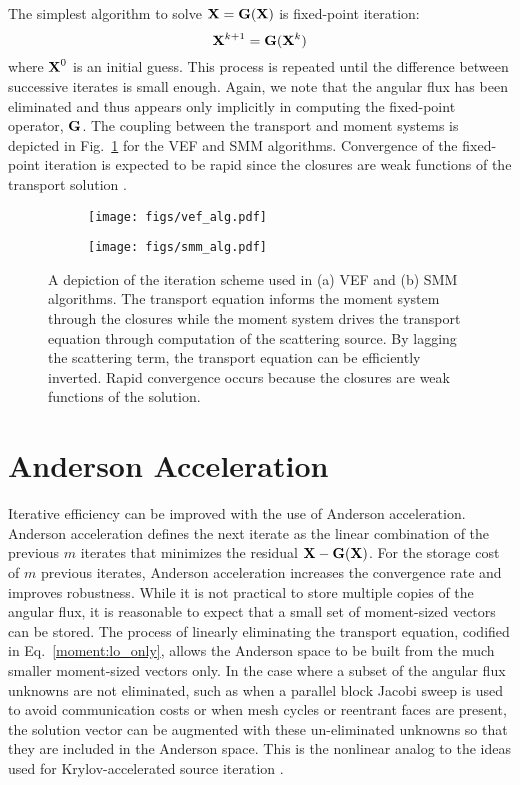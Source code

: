 \documentclass[../doc.tex]{subfiles}
\begin{document}
The simplest algorithm to solve $\boldsymbol{\mathrm{X}} = \boldsymbol{\mathrm{G}}(\boldsymbol{\mathrm{X}})$ is fixed-point iteration: 
	\begin{equation}
		\boldsymbol{\mathrm{X}}^{k+1} = \boldsymbol{\mathrm{G}}(\boldsymbol{\mathrm{X}}^k) 
	\end{equation}
where $\boldsymbol{\mathrm{X}}^0$ is an initial guess. This process is repeated until the difference between successive iterates is small enough. Again, we note that the angular flux has been eliminated and thus appears only implicitly in computing the fixed-point operator, $\boldsymbol{\mathrm{G}}$. The coupling between the transport and moment systems is depicted in Fig.~\ref{moment:moment_alg} for the VEF and SMM algorithms. Convergence of the fixed-point iteration is expected to be rapid since the closures are weak functions of the transport solution \cite{goldin}. 
\begin{figure}
\centering
\begin{subfigure}{.47\textwidth}
	\centering
	\texttt{[image: figs/vef\_alg.pdf]}	
	\caption{}
\end{subfigure}
\hfill
\begin{subfigure}{.47\textwidth}
	\centering
	\texttt{[image: figs/smm\_alg.pdf]}	
	\caption{}
\end{subfigure}
\caption{A depiction of the iteration scheme used in (a) VEF and (b) SMM algorithms. The transport equation informs the moment system through the closures while the moment system drives the transport equation through computation of the scattering source. By lagging the scattering term, the transport equation can be efficiently inverted. Rapid convergence occurs because the closures are weak functions of the solution.}
\label{moment:moment_alg}
\end{figure}

\section{Anderson Acceleration}
Iterative efficiency can be improved with the use of Anderson acceleration. Anderson acceleration defines the next iterate as the linear combination of the previous $m$ iterates that minimizes the residual $\boldsymbol{\mathrm{X}} - \boldsymbol{\mathrm{G}}(\boldsymbol{\mathrm{X}})$. For the storage cost of $m$ previous iterates, Anderson acceleration increases the convergence rate and improves robustness. While it is not practical to store multiple copies of the angular flux, it is reasonable to expect that a small set of moment-sized vectors can be stored. The process of linearly eliminating the transport equation, codified in Eq.~\ref{moment:lo_only}, allows the Anderson space to be built from the much smaller moment-sized vectors only. In the case where a subset of the angular flux unknowns are not eliminated, such as when a parallel block Jacobi sweep is used to avoid communication costs or when mesh cycles or reentrant faces are present, the solution vector can be augmented with these un-eliminated unknowns so that they are included in the Anderson space. This is the nonlinear analog to the ideas used for Krylov-accelerated source iteration \cite{doi:10.13182/NSE02-14}. 
\end{document}

